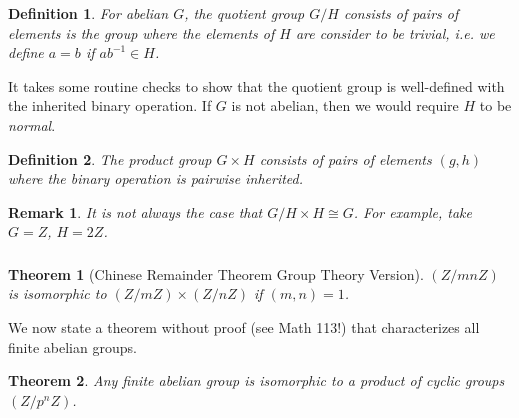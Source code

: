 \documentclass{article}
\newtheorem{theorem}{Theorem}
\newtheorem{definition}{Definition}
\newtheorem*{remark}{Remark}
\begin{document}
\begin{definition}
    For abelian $G$, the quotient group $G/H$ consists of pairs of elements is the group where the elements of $H$ are consider to be trivial, i.e. we define $a = b$ if $ab^{-1} \in H$. 
\end{definition}
It takes some routine checks to show that the quotient group is well-defined with the inherited binary operation. If $G$ is not abelian, then we would require $H$ to be \textit{normal}.
\begin{definition}
    The product group $G \times H$ consists of pairs of elements $(g, h)$ where the binary operation is pairwise inherited. 
\end{definition}
\begin{remark}
    It is not always the case that $G/H \times H \cong G$. For example, take $G = Z$, $H = 2Z$.
\end{remark}

\subsubsection{}
\begin{theorem}[Chinese Remainder Theorem Group Theory Version]
    $(Z/mnZ)$ is isomorphic to $(Z/mZ) \times (Z/nZ)$ if $(m,n) = 1$.
\end{theorem}
We now state a theorem without proof (see Math 113!) that characterizes all finite abelian groups.
\begin{theorem}
    Any finite abelian group is isomorphic to a product of cyclic groups $(Z/p^{n}Z)$.
\end{theorem}
\end{document}
